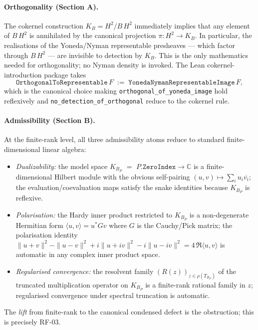 \documentclass[11pt]{article}
\theoremstyle{plain}
\theoremstyle{definition}
\theoremstyle{remark}
\newcommand{\HtH}{H^{2}}
\newcommand{\C}{\mathbb{C}}
\newcommand{\code}[1]{\texttt{#1}}
\begin{document}
\paragraph{Orthogonality (Section A).}
The cokernel construction \(K_{B} = \HtH / B\,\HtH\) immediately
implies that any element of \(B\,\HtH\) is annihilated by the
canonical projection \(\pi : \HtH \to K_{B}\).  In particular,
the realisations of the Yoneda/Nyman representable presheaves --- which
factor through \(B\,\HtH\) --- are invisible to detection by
\(K_{B}\).  This is the only mathematics needed for orthogonality;
no Nyman density is invoked.  The Lean cokernel-introduction package
takes
\[
  \code{OrthogonalToRepresentable}\,F
   \;:=\;
   \code{YonedaNymanRepresentableImage}\,F,
\]
which is the canonical choice making \code{orthogonal\_of\_yoneda\_image}
hold reflexively and \code{no\_detection\_of\_orthogonal} reduce to
the cokernel rule.

\paragraph{Admissibility (Section B).}
At the finite-rank level, all three admissibility atoms reduce to
standard finite-dimensional linear algebra:
\begin{itemize}[leftmargin=2em]
  \item \emph{Dualizability:} the model space \(K_{B_{P}}\)
        \(=\) \(P.\code{ZeroIndex} \to \C\) is a finite-dimensional
        Hilbert module with the obvious self-pairing
        \((u, v) \mapsto \sum_{i} u_{i} \overline{v_{i}}\); the
        evaluation/coevaluation maps satisfy the snake identities
        because \(K_{B_{P}}\) is reflexive.
  \item \emph{Polarisation:} the Hardy inner product restricted to
        \(K_{B_{P}}\) is a non-degenerate Hermitian form
        \(\langle u, v \rangle = u^{*} G v\) where \(G\) is the
        Cauchy/Pick matrix; the polarisation identity
        \(\|u + v\|^{2} - \|u - v\|^{2}
           + i\|u + iv\|^{2} - i\|u - iv\|^{2} = 4\,\Re\langle u, v\rangle\)
        is automatic in any complex inner product space.
  \item \emph{Regularised convergence:} the resolvent family
        \((R(z))_{z \in \rho(T_{B_{P}})}\) of the truncated
        multiplication operator on \(K_{B_{P}}\) is a finite-rank
        rational family in \(z\); regularised convergence under
        spectral truncation is automatic.
\end{itemize}
The \emph{lift} from finite-rank to the canonical condensed defect
is the obstruction; this is precisely RF-03.
\end{document}
